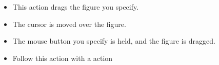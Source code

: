 
\begin{itemize}
\item This action drags the figure you specify.
\item The cursor is moved over the figure.
\item The mouse button you specify is held, and the figure is dragged. 
\item Follow this action with a  action
\end{itemize}


